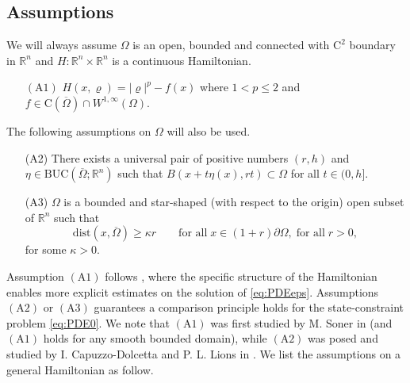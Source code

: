 \documentclass[11pt,reqno]{amsart}
\numberwithin{figure}{section}
\theoremstyle{plain}
\theoremstyle{remark}
\numberwithin{equation}{section}
\begin{document}
\subsection{Assumptions} We will always assume $\Omega$ is an open, bounded and connected with $\mathrm{C}^2$ boundary in $\mathbb{R}^n$ and $H:\mathbb{R}^n\times \mathbb{R}^n$ is a continuous Hamiltonian. 
\begin{itemize}
    \item[$\mathrm{(A1)}$] $H(x,\varrho) = |\varrho|^p - f(x)$ where $1<p\leq 2$ and $f\in \mathrm{C}(\overline{\Omega})\cap W^{1,\infty}(\Omega)$.
\end{itemize}
    The following assumptions on $\Omega$ will also be used.
\begin{itemize}    
    \item[(A2)] There exists a universal pair of positive numbers $(r,h)$ and $\eta\in \mathrm{BUC}(\overline{\Omega};\mathbb{R}^n)$ such that $B(x+t\eta(x), rt)\subset\Omega$ for all $t\in (0,h]$.
    \item[(A3)] $\Omega$ is a bounded and star-shaped (with respect to the origin) open subset of $\mathbb{R}^n$ such that
    \begin{equation*}
        \mathrm{dist}(x,\overline{\Omega}) \geq \kappa r \qquad\text{for all}\; x\in (1+r) \partial\Omega, \;\text{for all}\;r>0,
    \end{equation*}
for some $\kappa > 0$.
\end{itemize}
Assumption $\mathrm{(A1)}$ follows \cite{Lasry1989}, where the specific structure of the Hamiltonian enables more explicit estimates on the solution of \eqref{eq:PDEeps}. Assumptions $\mathrm{(A2)}$ or $\mathrm{(A3)}$ guarantees a comparison principle holds for the state-constraint problem \eqref{eq:PDE0}. We note that $\mathrm{(A1)}$ was first studied by M. Soner in \cite{Soner1986} (and $\mathrm{(A1)}$ holds for any smooth bounded domain), while $\mathrm{(A2)}$ was posed and studied by I. Capuzzo-Dolcetta and P. L. Lions in \cite{Capuzzo-Dolcetta1990}. We list the assumptions on a general Hamiltonian as follow.
\end{document}
